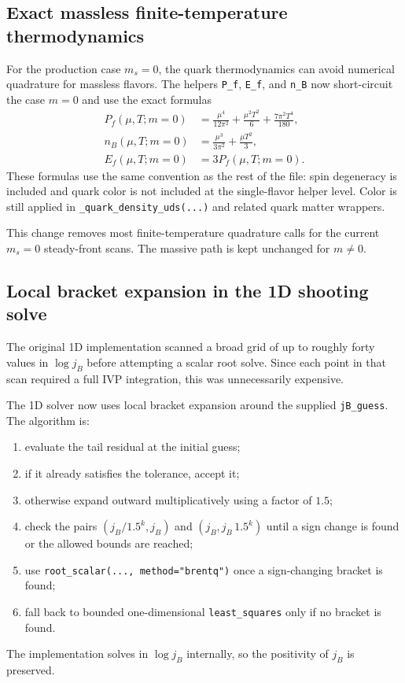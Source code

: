 \documentclass[11pt]{article}
\begin{document}
\subsection{Exact massless finite-temperature thermodynamics}
For the production case $m_s=0$, the quark thermodynamics can avoid numerical
quadrature for massless flavors. The helpers \texttt{P\_f}, \texttt{E\_f}, and
\texttt{n\_B} now short-circuit the case $m=0$ and use the exact formulas
\begin{align}
P_f(\mu,T;m=0) &= \frac{\mu^4}{12\pi^2}
              + \frac{\mu^2 T^2}{6}
              + \frac{7\pi^2 T^4}{180},\\
n_B(\mu,T;m=0) &= \frac{\mu^3}{3\pi^2} + \frac{\mu T^2}{3},\\
E_f(\mu,T;m=0) &= 3P_f(\mu,T;m=0).
\end{align}
These formulas use the same convention as the rest of the file: spin degeneracy
is included and quark color is not included at the single-flavor helper level.
Color is still applied in \texttt{\_quark\_density\_uds(...)} and related quark
matter wrappers.

This change removes most finite-temperature quadrature calls for the current
$m_s=0$ steady-front scans. The massive path is kept unchanged for $m\ne0$.

\subsection{Local bracket expansion in the 1D shooting solve}
The original 1D implementation scanned a broad grid of up to roughly forty
values in $\log j_B$ before attempting a scalar root solve. Since each point in
that scan required a full IVP integration, this was unnecessarily expensive.

The 1D solver now uses local bracket expansion around the supplied
\texttt{jB\_guess}. The algorithm is:
\begin{enumerate}[leftmargin=1.5em]
\item evaluate the tail residual at the initial guess;
\item if it already satisfies the tolerance, accept it;
\item otherwise expand outward multiplicatively using a factor of $1.5$;
\item check the pairs $(j_B/1.5^k,j_B)$ and $(j_B,j_B\,1.5^k)$ until a sign
      change is found or the allowed bounds are reached;
\item use \texttt{root\_scalar(..., method="brentq")} once a sign-changing
      bracket is found;
\item fall back to bounded one-dimensional \texttt{least\_squares} only if no
      bracket is found.
\end{enumerate}
The implementation solves in $\log j_B$ internally, so the positivity of $j_B$
is preserved.
\end{document}
